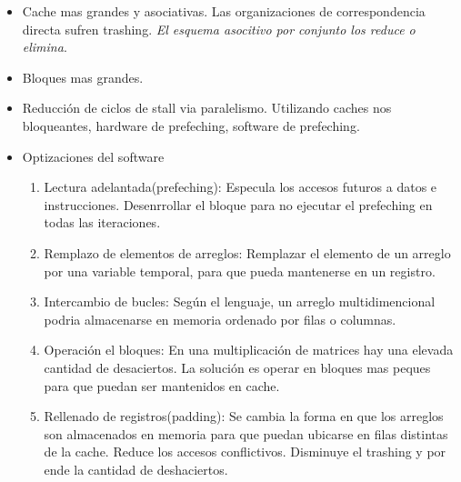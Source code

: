 \documentclass{article}
\begin{document}
\begin{itemize}
    \item Cache mas grandes y asociativas. Las organizaciones de correspondencia directa sufren trashing. \textit{El esquema asocitivo por conjunto los reduce o elimina}.
    \item Bloques mas grandes.
    \item Reducción de ciclos de stall via paralelismo. Utilizando caches nos bloqueantes, hardware de prefeching, software de prefeching.
    \item Optizaciones del software
    \begin{enumerate}
        \item Lectura adelantada(prefeching): Especula los accesos futuros a datos e instrucciones. Desenrrollar el bloque para no ejecutar el prefeching en todas las iteraciones.
        \item Remplazo de elementos de arreglos: Remplazar el elemento de un arreglo por una variable temporal, para que pueda mantenerse en un registro.
        \item Intercambio de bucles: Según el lenguaje, un arreglo multidimencional podria almacenarse en memoria ordenado por filas o columnas.
        \item Operación el bloques: En una multiplicación de matrices hay una elevada cantidad de desaciertos. La solución es operar en bloques mas peques para que puedan ser mantenidos en cache.
        \item Rellenado de registros(padding): Se cambia la forma en que los arreglos son almacenados en memoria para que puedan ubicarse en filas distintas de la cache. Reduce los accesos conflictivos. Disminuye el trashing y por ende la cantidad de deshaciertos.
    \end{enumerate}
\end{itemize}
\end{document}
